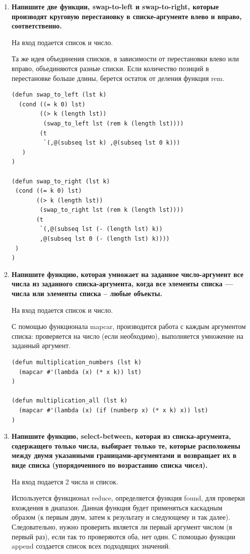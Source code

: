 \documentclass[a4paper,14pt]{extreport} %
\begin{document}
\begin{enumerate}
\item \textbf{Напишите две функции, swap-to-left и swap-to-right, которые производят круговую перестановку в списке-аргументе влево и вправо, соответственно.}

На вход подается список и число. 

Та же идея объединения списков, в зависимости от перестановки влево или вправо, объединяются разные списки. 
Если количество позиций в перестановке больше длины, берется остаток от деления функция rem. 

\begin{lstlisting}
(defun swap_to_left (lst k)
  (cond ((= k 0) lst)
        ((> k (length lst)) 
         (swap_to_left lst (rem k (length lst))))
        (t
         `(,@(subseq lst k) ,@(subseq lst 0 k)))
   ) 
)

(defun swap_to_right (lst k)
 (cond ((= k 0) lst)
       ((> k (length lst)) 
        (swap_to_right lst (rem k (length lst))))
       (t
        `(,@(subseq lst (- (length lst) k)) 
        ,@(subseq lst 0 (- (length lst) k))))
 ) 
)
\end{lstlisting}

\item \textbf{Напишите функцию, которая умножает на заданное число-аргумент все числа
из заданного списка-аргумента, когда все элементы списка --- числа или элементы списка -- любые объекты.}

На вход подается список и число. 

С помощью функционала mapcar, производится работа с каждым аргументом списка: проверяется на число (если необходимо), выполняется умножение на заданный аргумент. 

\begin{lstlisting}
(defun multiplication_numbers (lst k)
  (mapcar #'(lambda (x) (* x k)) lst)
)

(defun multiplication_all (lst k)
  (mapcar #'(lambda (x) (if (numberp x) (* x k) x)) lst)
)
\end{lstlisting}

\item \textbf{Напишите функцию, select-between, которая из списка-аргумента,
содержащего только числа, выбирает только те, которые расположены между двумя указанными границами-аргументами и возвращает их в виде списка (упорядоченного по возрастанию списка чисел).}

На вход подается 2 числа и список. 

Используется функционал reduce, определяется функция found, для проверки вхождения в диапазон. Данная функция будет применяться каскадным образом (к первым двум, затем к результату и следующему и так далее). Следовательно, нужно проверить является ли первый аргумент числом (в первый раз), если так то проверяются оба, нет один. С помощью функции append создается список всех подходящих значений. 


\end{enumerate}
\end{document}
